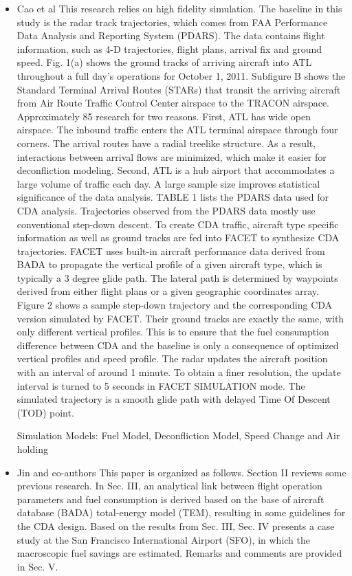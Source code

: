 \documentclass{aer1315-pretty}
\begin{document}
\begin{itemize}
\item Cao et al \cite{Cao:2013} 
This research relies on high fidelity simulation. The baseline in this study is the radar
track trajectories, which comes from FAA Performance Data Analysis and Reporting System
(PDARS). The data contains flight information, such as 4-D trajectories, flight plans, arrival fix
and ground speed. Fig. 1(a) shows the ground tracks of arriving aircraft into ATL throughout a
full day’s operations for October 1, 2011. Subfigure B shows the Standard Terminal Arrival
Routes (STARs) that transit the arriving aircraft from Air Route Traffic Control Center airspace
to the TRACON airspace. Approximately 85%
research for two reasons. First, ATL has wide open airspace. The inbound traffic enters the ATL
terminal airspace through four corners. The arrival routes have a radial treelike structure. As a
result, interactions between arrival flows are minimized, which make it easier for deconfliction
modeling. Second, ATL is a hub airport that accommodates a large volume of traffic each day. A
large sample size improves statistical significance of the data analysis. TABLE 1 lists the
PDARS data used for CDA analysis.
Trajectories observed from the PDARS data mostly use conventional step-down descent.
To create CDA traffic, aircraft type specific information as well as ground tracks are fed into
FACET to synthesize CDA trajectories. FACET uses built-in aircraft performance data derived
from BADA to propagate the vertical profile of a given aircraft type, which is typically a 3
degree glide path. The lateral path is determined by waypoints derived from either flight plans or
a given geographic coordinates array. Figure 2 shows a sample step-down trajectory and the
corresponding CDA version simulated by FACET. Their ground tracks are exactly the same,
with only different vertical profiles. This is to ensure that the fuel consumption difference
between CDA and the baseline is only a consequence of optimized vertical profiles and speed
profile. The radar updates the aircraft position with an interval of around 1 minute. To obtain a
finer resolution, the update interval is turned to 5 seconds in FACET SIMULATION mode. The
simulated trajectory is a smooth glide path with delayed Time Of Descent (TOD) point.

Simulation Models: Fuel Model, Deconfliction Model, Speed Change and Air holding


\item Jin and co-authors \cite{Jin:2013} 
  This paper is organized as follows. Section II reviews some
previous research. In Sec. III, an analytical link between flight
operation parameters and fuel consumption is derived based on
the base of aircraft database (BADA) total-energy model (TEM),
resulting in some guidelines for the CDA design. Based on the results
from Sec. III, Sec. IV presents a case study at the San Francisco
International Airport (SFO), in which the macroscopic fuel savings
are estimated. Remarks and comments are provided in Sec. V.


\end{itemize}
\end{document}
